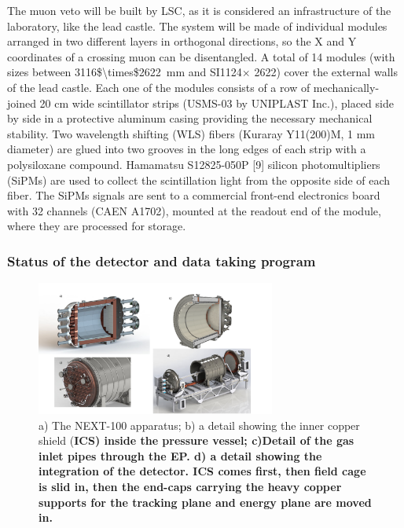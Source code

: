 The muon veto will be built by LSC, as it is considered an infrastructure of the laboratory, like the lead castle. The system will be made of individual modules arranged in two different layers in orthogonal directions, so the X and Y coordinates of a crossing muon can be disentangled. A total of 14 modules (with sizes between \SI{3116$\times$2622}{\mm} and SI{1124$\times$ 2622}{\mm}) cover the external walls of the lead castle. Each one of the modules consists of a row of mechanically-joined 20 cm wide scintillator strips  (USMS-03 by UNIPLAST Inc.), placed side by side in a protective aluminum casing providing the necessary mechanical stability. Two wavelength shifting (WLS) fibers (Kuraray Y11(200)M, 1 mm diameter) are glued into two grooves in the long edges of each strip with a polysiloxane compound. Hamamatsu S12825-050P [9] silicon photomultipliers (SiPMs) are used to collect the scintillation light from the opposite side of each fiber. The SiPMs signals are sent to a commercial front-end electronics board with 32 channels (CAEN A1702), mounted at the readout end of the module, where  they are processed for storage.

\subsubsection{Status of the detector and data taking program}

\begin{figure}[!htb]
\centering
\includegraphics[width=0.7\textwidth]{img2/collage.pdf}
\caption{\small a) The NEXT-100 apparatus; b) a detail showing the inner copper shield (\bf ICS) inside the pressure vessel; c)Detail of the gas inlet pipes through the EP. d) a detail showing the integration of the detector. ICS comes first, then field cage is slid in, then the end-caps carrying the heavy copper supports for the tracking plane and energy plane are moved in.} 
\label{fig.n100e}
\end{figure} 



